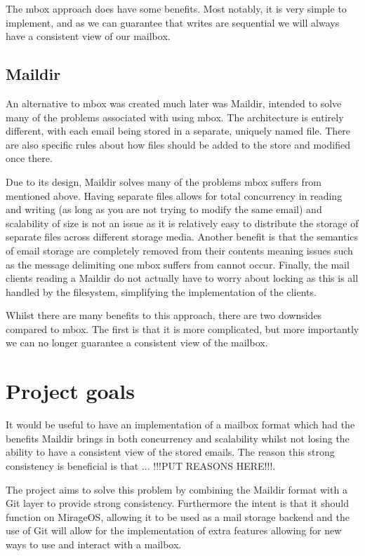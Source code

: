 The mbox approach does have some benefits. Most notably, it is very simple to implement, and as we can guarantee that writes are sequential we will always have a consistent view of our mailbox.

\subsection{Maildir}

An alternative to mbox was created much later was Maildir, intended to solve many of the problems associated with using mbox. The architecture is entirely different, with each email being stored in a separate, uniquely named file. There are also specific rules about how files should be added to the store and modified once there.

Due to its design, Maildir solves many of the problems mbox suffers from mentioned above. Having separate files allows for total concurrency in reading and writing (as long as you are not trying to modify the same email) and scalability of size is not an issue as it is relatively easy to distribute the storage of separate files across different storage media. Another benefit is that the semantics of email storage are completely removed from their contents meaning issues such as the message delimiting one mbox suffers from cannot occur. Finally, the mail clients reading a Maildir do not actually have to worry about locking as this is all handled by the filesystem, simplifying the implementation of the clients.

Whilst there are many benefits to this approach, there are two downsides compared to mbox. The first is that it is more complicated, but more importantly we can no longer guarantee a consistent view of the mailbox.

\section{Project goals}

It would be useful to have an implementation of a mailbox format which had the benefits Maildir brings in both concurrency and scalability whilst not losing the ability to have a consistent view of the stored emails. The reason this strong consistency is beneficial is that ... !!!PUT REASONS HERE!!!.

The project aims to solve this problem by combining the Maildir format with a Git layer to provide strong consistency. Furthermore the intent is that it should function on MirageOS, allowing it to be used as a mail storage backend and the use of Git will allow for the implementation of extra features allowing for new ways to use and interact with a mailbox.
